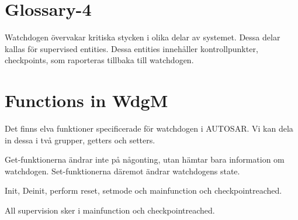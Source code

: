 \documentclass[a4paper]{article}
\begin{document}




\section{Glossary-4}
Watchdogen övervakar kritiska stycken i olika delar av systemet. Dessa
delar kallas för supervised entities. Dessa entities innehåller
kontrollpunkter, checkpoints, som raporteras tillbaka till watchdogen.



\section{Functions in WdgM}
Det finns elva funktioner specificerade för watchdogen i AUTOSAR.
Vi kan dela in dessa i två grupper, getters och setters.


Get-funktionerna ändrar inte på någonting, utan hämtar bara
information om watchdogen.
Set-funktionerna däremot ändrar watchdogens state.

Init, Deinit, perform reset, setmode och
mainfunction och checkpointreached.

All supervision sker i mainfunction och checkpointreached.


\end{document}

